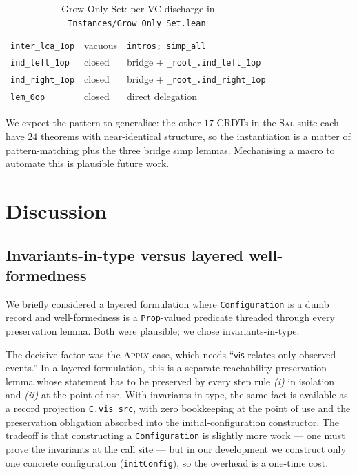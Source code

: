 \documentclass[11pt,a4paper]{article}
\theoremstyle{definition}
\theoremstyle{remark}
\newcommand{\mvis}{\mathsf{vis}}
\newcommand{\Sal}{\textsc{Sal}}
\begin{document}
\begin{table}[t]
\begin{tabular}{@{}llp{6cm}@{}}
    \texttt{inter\_lca\_1op}         & vacuous & \texttt{intros; simp\_all} \\
    \texttt{ind\_left\_1op}          & closed & bridge + \texttt{\_root\_.ind\_left\_1op} \\
    \texttt{ind\_right\_1op}         & closed & bridge + \texttt{\_root\_.ind\_right\_1op} \\
    \texttt{lem\_0op}                & closed & direct delegation \\
    \bottomrule
  \end{tabular}
  \caption{Grow-Only Set: per-VC discharge in
    \texttt{Instances/Grow\_Only\_Set.lean}.}
  \label{tab:gset-vcs}
\end{table}

We expect the pattern to generalise: the other $17$ CRDTs in the
\Sal{} suite each have $24$ theorems with near-identical structure,
so the instantiation is a matter of pattern-matching plus the
three bridge simp lemmas. Mechanising a macro to automate this is
plausible future work.

\section{Discussion}
\label{sec:discussion}

\subsection{Invariants-in-type versus layered well-formedness}

We briefly considered a layered formulation where
\texttt{Configuration} is a dumb record and well-formedness is a
\texttt{Prop}-valued predicate threaded through every preservation
lemma. Both were plausible; we chose invariants-in-type.

The decisive factor was the \textsc{Apply} case, which needs ``$\mvis$
relates only observed events.'' In a layered formulation, this
is a separate reachability-preservation lemma whose statement has to
be preserved by every step rule \emph{(i)} in isolation and
\emph{(ii)} at the point of use. With invariants-in-type, the same
fact is available as a record projection \texttt{C.vis\_src}, with
zero bookkeeping at the point of use and the preservation obligation
absorbed into the initial-configuration constructor. The tradeoff
is that constructing a \texttt{Configuration} is slightly more
work --- one must prove the invariants at the call site --- but in
our development we construct only one concrete configuration
(\texttt{initConfig}), so the overhead is a one-time cost.
\end{document}

